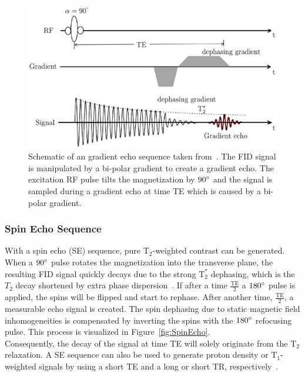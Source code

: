 \begin{figure}[h] %
	\centering
	\includegraphics[width=\linewidth]{./Images/GradientEcho.pdf} 
	\caption{Schematic of an gradient echo sequence taken from~\cite{PulseSequences}. The FID signal is manipulated by a bi-polar gradient to create a gradient echo. The excitation RF pulse tilts the magnetization by $90 \degree$ and the signal is sampled during a gradient echo at time TE which is caused by a bi-polar gradient.}
	\label{fig:GradientEcho}
\end{figure}

\subsubsection{Spin Echo Sequence}
With a spin echo (SE) sequence, pure $\text{T}_2$-weighted contrast can be generated. When a $90\degree$ pulse rotates the magnetization into the transverse plane, the resulting FID signal quickly decays due to the strong $\text{T}^*_2$ dephasing, which is the $T_2$ decay shortened by extra phase dispersion~\cite{Serai2021}. If after a time $\frac{\text{TE}}{2}$ a $180\degree$ pulse is applied, the spins will be flipped and start to rephase. After another time, $\frac{\text{TE}}{2}$, a measurable echo signal is created. The spin dephasing due to static magnetic field inhomogeneities is compensated by inverting the spins with the $180\degree$ refocusing pulse. This process is visualized in Figure~\ref{fig:SpinEcho}.\\
Consequently, the decay of the signal at time TE will solely originate from the $\text{T}_2$ relaxation. A SE sequence can also be used to generate proton density or $\text{T}_1$-weighted signals by using a short TE and a long or short TR, respectively~\cite{PulseSequences}.

